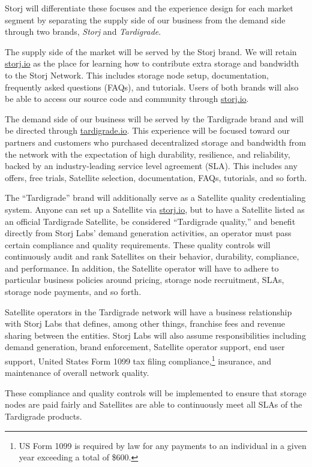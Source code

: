 \documentclass[8pt,fleqn,openany]{book}
\begin{document}
Storj will differentiate these focuses and the experience design
for each market segment by separating the supply side of our business from the
demand side through two brands, {\em Storj} and {\em Tardigrade}.

The supply side of the market will be served by the Storj brand.
We will retain \url{storj.io} as the place for learning how to contribute extra storage and
bandwidth to the Storj Network. This includes storage node setup, documentation,
frequently asked questions (FAQs), and tutorials. Users of both brands will also be able to
access our source code and community through \url{storj.io}.

The demand side of our business will be served by the Tardigrade brand and
will be directed through \url{tardigrade.io}.
This experience will be focused toward our partners and customers who purchased
decentralized storage and bandwidth from the network with the expectation of
high durability, resilience, and reliability, backed by an industry-leading
service level agreement (SLA). This includes any offers, free trials, Satellite
selection, documentation, FAQs, tutorials, and so forth.

The ``Tardigrade'' brand will additionally serve as a Satellite quality
credentialing system. Anyone can set up a Satellite via
\url{storj.io}, but to have a Satellite listed as an official Tardigrade
Satellite, be considered ``Tardigrade quality,'' and benefit directly from
Storj Labs' demand generation activities, an operator must pass
certain compliance and quality requirements.
These quality controls will continuously audit and rank Satellites on their
behavior, durability, compliance, and performance.
In addition, the Satellite operator will have to adhere to particular business
policies around pricing, storage node recruitment, SLAs, storage node payments,
and so forth.

Satellite operators in the Tardigrade network will have a business
relationship with Storj Labs that defines, among other things, franchise fees
and revenue sharing between the entities. Storj Labs will also assume
responsibilities including demand generation, brand enforcement, Satellite
operator support, end user support, United States Form 1099 tax filing
compliance,\footnote{US Form 1099 is required by law for any payments to an
individual in a given year exceeding a total of \$600.}
insurance, and maintenance of overall network quality.

These compliance and quality controls will be implemented to ensure that
storage nodes are paid fairly and Satellites are able to continuously meet all
SLAs of the Tardigrade products.
\end{document}

